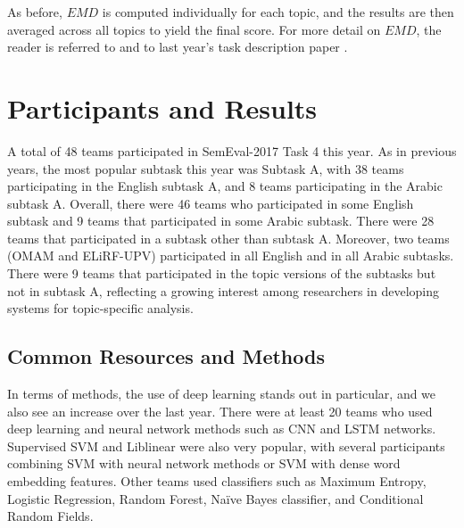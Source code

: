 \documentclass[11pt,a4paper]{article}
\begin{document}
\noindent As before, $EMD$ is computed individually for each topic, and the
results are then averaged across all topics to yield the final score.
For more detail on $EMD$, the reader is referred to \cite{Esuli:2010fk} and to last year's task description paper \cite{nakov-EtAl:2016:SemEval1}.


\section{Participants and Results}
\label{sec:results}

A total of 48 teams participated in SemEval-2017 Task 4 this year. As in previous years, the most popular subtask this year was Subtask A, with 38 teams participating in the English subtask A, and 8 teams participating in the Arabic subtask A. Overall, there were 46 teams who participated in some English subtask and 9 teams that participated in some Arabic subtask.
There were 28 teams that participated in a subtask other than subtask A. Moreover, two teams (OMAM and ELiRF-UPV) 
participated in all English and in all Arabic subtasks. There were 9 teams that participated in the topic versions of the subtasks but not in subtask A, reflecting a growing interest among researchers in developing systems for topic-specific analysis. 

\subsection{Common Resources and Methods}

In terms of methods, the use of deep learning stands out in particular, and we also see an increase over the last year.
There were at least 20 teams 
who used deep learning and neural network methods such as CNN and LSTM networks. %
Supervised SVM and Liblinear were also very popular, with several participants combining SVM with neural network methods or SVM with dense word embedding features. Other teams used classifiers such as Maximum Entropy, Logistic Regression, Random Forest, Na\"{i}ve Bayes classifier, and Conditional Random Fields.    %
\end{document}
